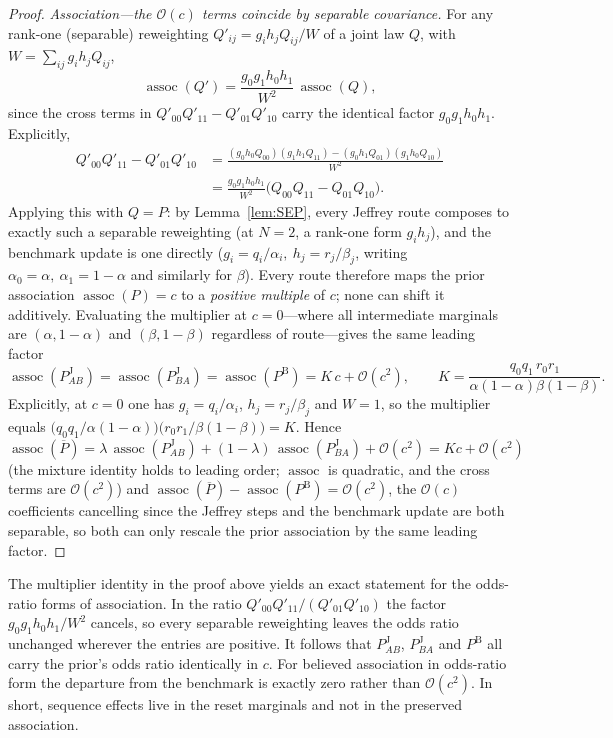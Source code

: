 \documentclass[a4paper,fleqn]{cas-sc}
\theoremstyle{remark}
\theoremstyle{definition}
\newcommand{\PB}{P^{\mathrm{B}}}
\newcommand{\PJ}{P^{\mathrm{J}}}
\newcommand{\Pbar}{\overline{P}}
\newcommand{\assoc}{\operatorname{assoc}}
\newcommand{\bigO}{\mathcal{O}}
\begin{document}
\begin{proof}
\emph{Association---the $\bigO(c)$ terms coincide by separable covariance.} For any rank-one
(separable) reweighting $Q'_{ij}=g_i h_j Q_{ij}/W$ of a joint law $Q$, with $W=\sum_{ij}g_i h_j Q_{ij}$,
\[
  \assoc(Q')=\frac{g_0 g_1 h_0 h_1}{W^{2}}\,\assoc(Q),
\]
since the cross terms in $Q'_{00}Q'_{11}-Q'_{01}Q'_{10}$ carry the identical factor
$g_0g_1h_0h_1$. Explicitly,
\begin{align*}
  Q'_{00}Q'_{11}-Q'_{01}Q'_{10}
  &=\frac{(g_0h_0Q_{00})(g_1h_1Q_{11})-(g_0h_1Q_{01})(g_1h_0Q_{10})}{W^{2}}\\
  &=\frac{g_0g_1h_0h_1}{W^{2}}\bigl(Q_{00}Q_{11}-Q_{01}Q_{10}\bigr).
\end{align*}
Applying this with $Q=P$: by Lemma~\ref{lem:SEP}, every Jeffrey route composes to exactly such a
separable reweighting (at $N=2$, a rank-one form $g_ih_j$), and the benchmark update is one
directly ($g_i=q_i/\alpha_i,\ h_j=r_j/\beta_j$, writing $\alpha_0=\alpha,\ \alpha_1=1-\alpha$ and
similarly for $\beta$). Every route therefore
maps the prior association $\assoc(P)=c$ to a \emph{positive multiple} of $c$; none can shift it
additively. Evaluating the multiplier at $c=0$---where all intermediate marginals are
$(\alpha,1-\alpha)$ and $(\beta,1-\beta)$ regardless of route---gives the same leading factor
\[
  \assoc(\PJ_{AB})=\assoc(\PJ_{BA})=\assoc(\PB)=K\,c+\bigO(c^2),
  \qquad K=\frac{q_0 q_1\, r_0 r_1}{\alpha(1-\alpha)\beta(1-\beta)} .
\]
Explicitly, at $c=0$ one has $g_i=q_i/\alpha_i$, $h_j=r_j/\beta_j$ and $W=1$, so the
multiplier equals $\bigl(q_0q_1/\alpha(1-\alpha)\bigr)\bigl(r_0r_1/\beta(1-\beta)\bigr)=K$.
Hence $\assoc(\Pbar)=\lambda\,\assoc(\PJ_{AB})+(1-\lambda)\,\assoc(\PJ_{BA})+\bigO(c^2)
=Kc+\bigO(c^2)$ (the mixture identity holds to leading order; $\assoc$ is quadratic, and the
cross terms are $\bigO(c^2)$) and
$\assoc(\Pbar)-\assoc(\PB)=\bigO(c^2)$, the $\bigO(c)$ coefficients cancelling since the Jeffrey steps and the benchmark update are both separable, so both can only rescale the prior
association by the same leading factor.

\end{proof}

The multiplier identity in the proof above yields an exact statement for the odds-ratio forms of association. In the ratio $Q'_{00}Q'_{11}/(Q'_{01}Q'_{10})$ the factor
$g_0g_1h_0h_1/W^{2}$ cancels, so every separable reweighting leaves the odds ratio unchanged wherever the entries are positive. It follows that $\PJ_{AB}$, $\PJ_{BA}$ and $\PB$ all carry the prior's odds ratio
identically in $c$. For believed association in odds-ratio form the departure from the benchmark is exactly zero rather than $\bigO(c^{2})$. In short, sequence effects live in the reset marginals and not in the preserved
association.
\end{document}
